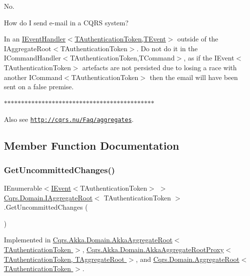 No. 

How do I send e-\/mail in a C\+Q\+RS system? 

In an \hyperlink{interfaceCqrs_1_1Events_1_1IEventHandler}{I\+Event\+Handler$<$\+T\+Authentication\+Token,\+T\+Event$>$} outside of the I\+Aggregate\+Root$<$\+T\+Authentication\+Token$>$. Do not do it in the I\+Command\+Handler$<$\+T\+Authentication\+Token,\+T\+Command$>$, as if the I\+Event$<$\+T\+Authentication\+Token$>$ artefacts are not persisted due to losing a race with another I\+Command$<$\+T\+Authentication\+Token$>$ then the email will have been sent on a false premise. 

$\ast$$\ast$$\ast$$\ast$$\ast$$\ast$$\ast$$\ast$$\ast$$\ast$$\ast$$\ast$$\ast$$\ast$$\ast$$\ast$$\ast$$\ast$$\ast$$\ast$$\ast$$\ast$$\ast$$\ast$$\ast$$\ast$$\ast$$\ast$$\ast$$\ast$$\ast$$\ast$$\ast$$\ast$$\ast$$\ast$$\ast$$\ast$$\ast$$\ast$$\ast$$\ast$$\ast$$\ast$ 

Also see \href{http://cqrs.nu/Faq/aggregates}{\tt http\+://cqrs.\+nu/\+Faq/aggregates}. 

\subsection{Member Function Documentation}
\mbox{\label{interfaceCqrs_1_1Domain_1_1IAggregateRoot_a22fda414613f5ac0d4371554d7d6473b_a22fda414613f5ac0d4371554d7d6473b}} 
\subsubsection{\texorpdfstring{Get\+Uncommitted\+Changes()}{GetUncommittedChanges()}}
{\footnotesize\ttfamily I\+Enumerable$<$\hyperlink{interfaceCqrs_1_1Events_1_1IEvent}{I\+Event}$<$T\+Authentication\+Token$>$ $>$ \hyperlink{interfaceCqrs_1_1Domain_1_1IAggregateRoot}{Cqrs.\+Domain.\+I\+Aggregate\+Root}$<$ T\+Authentication\+Token $>$.Get\+Uncommitted\+Changes (\begin{DoxyParamCaption}{ }\end{DoxyParamCaption})}



Implemented in \hyperlink{classCqrs_1_1Akka_1_1Domain_1_1AkkaAggregateRoot_a2d11510fec0129ba318f63f7103aeec0_a2d11510fec0129ba318f63f7103aeec0}{Cqrs.\+Akka.\+Domain.\+Akka\+Aggregate\+Root$<$ T\+Authentication\+Token $>$}, \hyperlink{classCqrs_1_1Akka_1_1Domain_1_1AkkaAggregateRootProxy_afa620ced4762b0539da23ca063fed489_afa620ced4762b0539da23ca063fed489}{Cqrs.\+Akka.\+Domain.\+Akka\+Aggregate\+Root\+Proxy$<$ T\+Authentication\+Token, T\+Aggregate\+Root $>$}, and \hyperlink{classCqrs_1_1Domain_1_1AggregateRoot_a625e885ec7885a686f729ed1efe3a8fa_a625e885ec7885a686f729ed1efe3a8fa}{Cqrs.\+Domain.\+Aggregate\+Root$<$ T\+Authentication\+Token $>$}.

